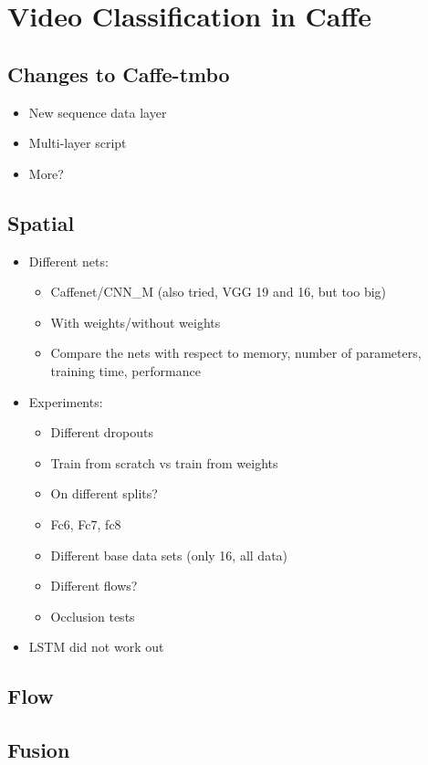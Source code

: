 \section{Video Classification in Caffe}
\label{sec:classificaton}

\subsection{Changes to Caffe-tmbo}

\begin{itemize}
	\item New sequence data layer
	\item Multi-layer script
	\item More?
\end{itemize}

\subsection{Spatial}

\begin{itemize}
	\item
		Different nets:
		\begin{itemize}
			\item Caffenet/CNN\_M (also tried, VGG 19 and 16, but too big)
			\item With weights/without weights
			\item Compare the nets with respect to memory, number of parameters, training time, performance
		\end{itemize}
	\item
		Experiments:
		\begin{itemize}
			\item Different dropouts
			\item Train from scratch vs train from weights
			\item On different splits?
			\item Fc6, Fc7, fc8
			\item Different base data sets (only 16, all data)
			\item Different flows?
			\item Occlusion tests
		\end{itemize}
	\item
		LSTM did not work out
\end{itemize}


\subsection{Flow}
\subsection{Fusion}
